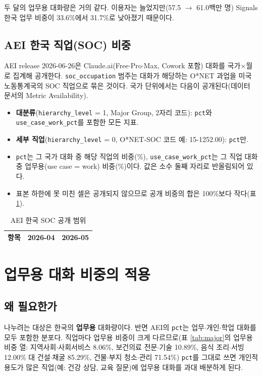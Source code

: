 \documentclass[11pt]{article}
\begin{document}
두 달의 업무용 대화량은 거의 같다. 이용자는 늘었지만(57.5 $\to$ 61.0백만 명) Signals 한국 업무 비중이 33.6\%에서 31.7\%로 낮아졌기 때문이다.

\subsection{AEI 한국 직업(SOC) 비중}
AEI release 2026-06-26은 Claude.ai(Free$\cdot$Pro$\cdot$Max, Cowork 포함) 대화를 국가$\times$월로 집계해 공개한다. \texttt{soc\_occupation} 범주는 대화가 해당하는 O*NET 과업을 미국 노동통계국의 SOC 직업으로 묶은 것이다. 국가 단위에서는 다음이 공개된다(데이터 문서의 Metric Availability).
\begin{itemize}
  \item \textbf{대분류}(\texttt{hierarchy\_level} = 1, Major Group, 2자리 코드): \texttt{pct}와 \texttt{use\_case\_work\_pct}를 포함한 모든 지표.
  \item \textbf{세부 직업}(\texttt{hierarchy\_level} = 0, O*NET-SOC 코드 예: 15-1252.00): \texttt{pct}만.
  \item \texttt{pct}는 그 국가 대화 중 해당 직업의 비중(\%), \texttt{use\_case\_work\_pct}는 그 직업 대화 중 업무용(use case = work) 비중(\%)이다. 값은 소수 둘째 자리로 반올림되어 있다.
  \item 표본 하한에 못 미친 셀은 공개되지 않으므로 공개 비중의 합은 100\%보다 작다(표 \ref{tab:coverage}).
\end{itemize}

\begin{table}[h]
\centering
\caption{AEI 한국 SOC 공개 범위}\label{tab:coverage}
\begin{tabular}{lrr}
\toprule
항목 & 2026-04 & 2026-05 \\
\midrule

\bottomrule
\end{tabular}
\end{table}

\section{업무용 대화 비중의 적용}

\subsection{왜 필요한가}
나누려는 대상은 한국의 \textbf{업무용} 대화량이다. 반면 AEI의 \texttt{pct}는 업무$\cdot$개인$\cdot$학업 대화를 모두 포함한 분포다. 직업마다 업무용 비중이 크게 다르므로(표 \ref{tab:major}의 업무용 비중 열: 지역사회$\cdot$사회서비스 8.06\%, 보건의료 전문$\cdot$기술 10.89\%, 음식 조리$\cdot$서빙 12.00\% 대 건설$\cdot$채굴 85.29\%, 건물$\cdot$부지 청소$\cdot$관리 71.54\%) \texttt{pct}를 그대로 쓰면 개인적 용도가 많은 직업(예: 건강 상담, 교육 질문)에 업무용 대화를 과대 배분하게 된다.
\end{document}
